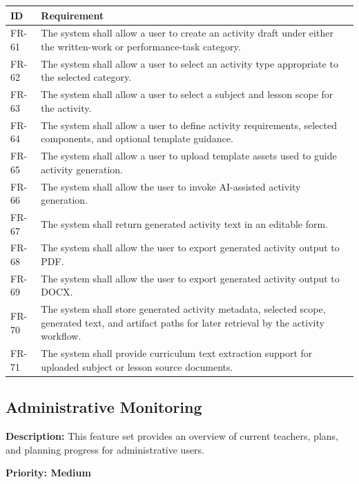\documentclass[12pt]{article}
\begin{document}
\begin{longtable}{|L{2.3cm}|L{11.3cm}|}
\hline
\textbf{ID} & \textbf{Requirement} \\
\hline
FR-61 & The system shall allow a user to create an activity draft under either the written-work or performance-task category. \\
\hline
FR-62 & The system shall allow a user to select an activity type appropriate to the selected category. \\
\hline
FR-63 & The system shall allow a user to select a subject and lesson scope for the activity. \\
\hline
FR-64 & The system shall allow a user to define activity requirements, selected components, and optional template guidance. \\
\hline
FR-65 & The system shall allow a user to upload template assets used to guide activity generation. \\
\hline
FR-66 & The system shall allow the user to invoke AI-assisted activity generation. \\
\hline
FR-67 & The system shall return generated activity text in an editable form. \\
\hline
FR-68 & The system shall allow the user to export generated activity output to PDF. \\
\hline
FR-69 & The system shall allow the user to export generated activity output to DOCX. \\
\hline
FR-70 & The system shall store generated activity metadata, selected scope, generated text, and artifact paths for later retrieval by the activity workflow. \\
\hline
FR-71 & The system shall provide curriculum text extraction support for uploaded subject or lesson source documents. \\
\hline
\end{longtable}

\subsection{Administrative Monitoring}

\textbf{Description:} This feature set provides an overview of current teachers,
plans, and planning progress for administrative users.

\textbf{Priority: Medium}
\end{document}
